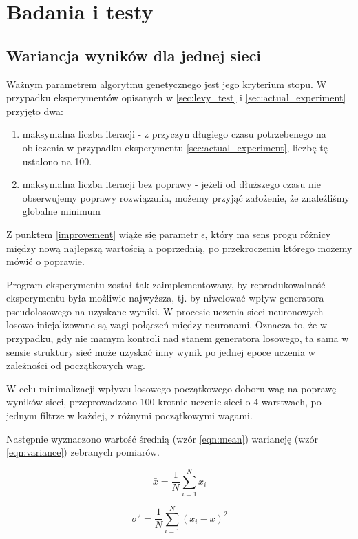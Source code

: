 \chapter{Badania i testy}\label{chap:tests}
\section{Wariancja wyników dla jednej sieci}\label{sec:std_dev}
Ważnym parametrem algorytmu genetycznego jest jego kryterium stopu.
W przypadku eksperymentów opisanych w \ref{sec:levy_test} i \ref{sec:actual_experiment} przyjęto dwa:
\begin{enumerate}
  \item maksymalna liczba iteracji - z przyczyn długiego czasu potrzebenego na obliczenia w przypadku eksperymentu \ref{sec:actual_experiment}, liczbę tę ustalono na 100.
  \item maksymalna liczba iteracji bez poprawy - jeżeli od dłuższego czasu nie obserwujemy poprawy rozwiązania, możemy przyjąć założenie, że znaleźliśmy globalne minimum\label{improvement}
\end{enumerate}
Z punktem \ref{improvement} wiąże się parametr $\epsilon$, który ma sens progu różnicy między nową najlepszą wartością a poprzednią, po przekroczeniu którego możemy mówić o poprawie.

Program eksperymentu został tak zaimplementowany, by reprodukowalność eksperymentu była możliwie najwyższa, tj. by niwelować wpływ generatora pseudolosowego na uzyskane wyniki.
W procesie uczenia sieci neuronowych losowo inicjalizowane są wagi połączeń między neuronami.
Oznacza to, że w przypadku, gdy nie mamym kontroli nad stanem generatora losowego, ta sama w sensie struktury sieć może uzyskać inny wynik po jednej epoce uczenia w zależności od początkowych wag.

W celu minimalizacji wpływu losowego początkowego doboru wag na poprawę wyników sieci, przeprowadzono 100-krotnie uczenie sieci o 4 warstwach, po jednym filtrze w każdej, z różnymi początkowymi wagami.

Następnie wyznaczono wartość średnią (wzór \ref{eqn:mean}) wariancję (wzór \ref{eqn:variance}) zebranych pomiarów.

\begin{equation}\label{eqn:mean}
  \bar{x} = \frac{1}{N} \sum_{i=1}^{N} x_i
\end{equation}

\begin{equation}\label{eqn:variance}
  \sigma^2 = \frac{1}{N} \sum_{i=1}^{N}(x_i - \bar{x})^2
\end{equation}


